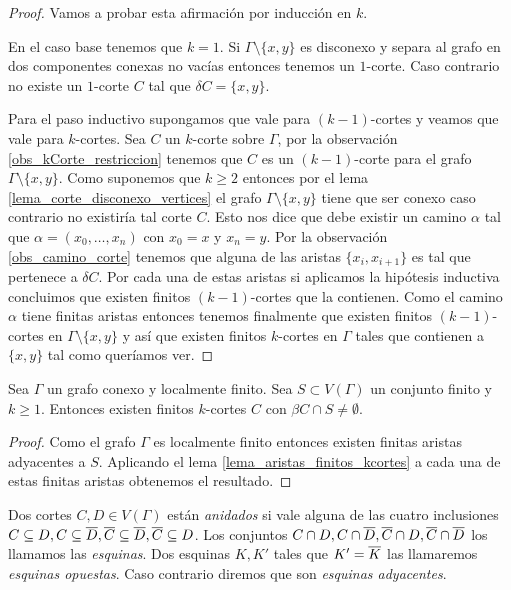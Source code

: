 \documentclass[tesis.tex]{subfiles}
\begin{document}
\begin{proof}
	Vamos a probar esta afirmación por inducción en $k$.
	
	En el caso base tenemos que $k=1$. 
	Si $\Gamma \setminus \{x,y\}$ es disconexo y separa al grafo en dos componentes conexas no vacías entonces tenemos un $1$-corte. 
	Caso contrario no existe un $1$-corte $C$ tal que $\delta C = \{x,y\}$.
	
	Para el paso inductivo supongamos que vale para $(k-1)$-cortes y veamos que vale para $k$-cortes.
	Sea $C$ un $k$-corte sobre $\Gamma$, por la observación \ref{obs_kCorte_restriccion} tenemos que $C$ es un $(k-1)$-corte para el grafo $\Gamma \setminus \{x,y\}$.
	Como suponemos que $k \ge 2$ entonces por el lema \ref{lema_corte_disconexo_vertices} el grafo $\Gamma \setminus \{x,y\}$ tiene que ser conexo caso contrario no existiría tal corte $C$.
	Esto nos dice que debe existir un camino $\alpha$ tal que $\alpha = (x_{0}, \dots, x_{n})$ con $x_{0} = x$ y $x_{n} = y$.
	Por la observación \ref{obs_camino_corte} tenemos que alguna de las aristas $\{x_{i},x_{i+1}\}$ es tal que pertenece a $\delta C$.
	Por cada una de estas aristas si aplicamos la hipótesis inductiva concluimos que existen finitos $(k-1)$-cortes que la contienen.
	Como el camino $\alpha$ tiene finitas aristas entonces tenemos finalmente que existen finitos $(k-1)$-cortes en $\Gamma \setminus \{x,y\}$ y así que existen finitos $k$-cortes en $\Gamma$ tales que contienen a $\{x,y\}$ tal como queríamos ver.
	
\end{proof}




\begin{coro}\label{lema_finitos_kcortes}
	Sea $\Gamma$ un grafo conexo y localmente finito.
	Sea $S \subset V(\Gamma)$ un conjunto finito y $k\ge 1$.
	Entonces existen finitos $k$-cortes $C$ con $\beta C \cap S \neq \emptyset$.
\end{coro}	

\begin{proof}
	Como el grafo $\Gamma$ es localmente finito entonces existen finitas aristas adyacentes a $S$.
	Aplicando el lema \ref{lema_aristas_finitos_kcortes} a cada una de estas finitas aristas obtenemos el resultado.	
\end{proof}
	





\begin{deff}
	Dos cortes $C,D \in V(\Gamma)$ están \emph{anidados} si vale alguna de las cuatro inclusiones $C \subseteq D, C \subseteq \overline D, \overline C \subseteq \overline D, \overline C \subseteq D$.
	Los conjuntos $C \cap D, C \cap \overline D, \overline C \cap D, \overline C \cap \overline D$ los llamamos las \emph{esquinas}.
	Dos esquinas $K,K'$ tales que $K' = \overline K$ las llamaremos \emph{esquinas opuestas}.
	Caso contrario diremos que son \emph{esquinas adyacentes}.
\end{deff}
\end{document}

